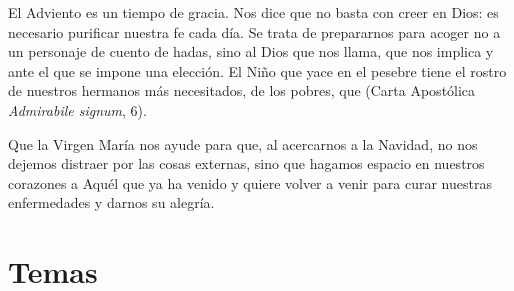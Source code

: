 \begin{body}
					El Adviento es un tiempo de gracia. Nos dice que no basta con creer en Dios: es necesario purificar nuestra fe cada día. Se trata de prepararnos para acoger no a un personaje de cuento de hadas, sino al Dios que nos llama, que nos implica y ante el que se impone una elección. El Niño que yace en el pesebre tiene el rostro de nuestros hermanos más necesitados, de los pobres, que  (Carta Apostólica \emph{Admirabile signum}, 6).
					
					Que la Virgen María nos ayude para que, al acercarnos a la Navidad, no nos dejemos distraer por las cosas externas, sino que hagamos espacio en nuestros corazones a Aquél que ya ha venido y quiere volver a venir para curar nuestras enfermedades y darnos su alegría.
				\end{body}
			
			
	\newsection 			
			
	\section{Temas}
		
		
				
	
